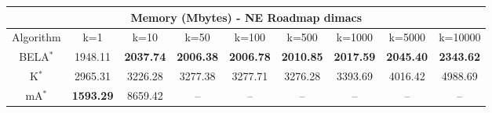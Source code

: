 \begin{tabular}{c|cccccccc}\toprule
\multicolumn{9}{c}{Memory (Mbytes) - NE Roadmap dimacs}\\ \midrule
Algorithm & k=1 & k=10 & k=50 & k=100 & k=500 & k=1000 & k=5000 & k=10000 \\ \midrule
BELA$^*$ & 1948.11 & \textbf{2037.74} & \textbf{2006.38} & \textbf{2006.78} & \textbf{2010.85} & \textbf{2017.59} & \textbf{2045.40} & \textbf{2343.62} \\
K$^*$ & 2965.31 & 3226.28 & 3277.38 & 3277.71 & 3276.28 & 3393.69 & 4016.42 & 4988.69 \\
mA$^*$ & \textbf{1593.29} & 8659.42 & -- & -- & -- & -- & -- & -- \\ \bottomrule 
\end{tabular}
